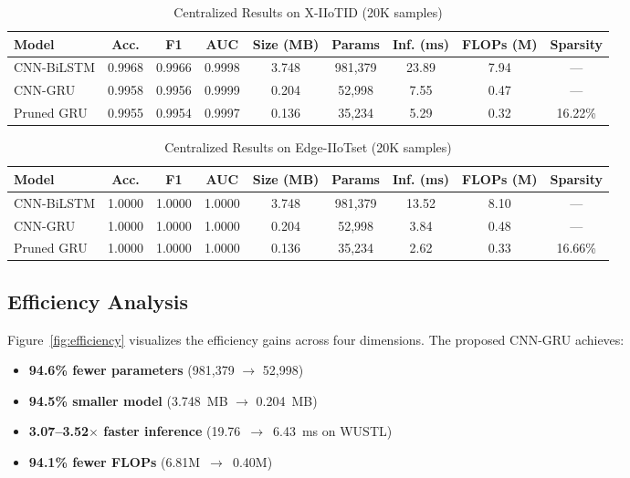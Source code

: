 \documentclass[a4paper,fleqn]{cas-sc}
\begin{document}
\begin{table}[t]
\centering
\caption{Centralized Results on X-IIoTID (20K samples)}
\label{tab:xiitoid}
\begin{tabular}{lcccccccc}
\toprule
Model & Acc. & F1 & AUC & Size (MB) & Params & Inf. (ms) & FLOPs (M) & Sparsity \\
\midrule
CNN-BiLSTM & 0.9968 & 0.9966 & 0.9998 & 3.748 & 981,379 & 23.89 & 7.94 & --- \\
CNN-GRU & 0.9958 & 0.9956 & 0.9999 & 0.204 & 52,998 & 7.55 & 0.47 & --- \\
Pruned GRU & 0.9955 & 0.9954 & 0.9997 & 0.136 & 35,234 & 5.29 & 0.32 & 16.22\% \\
\bottomrule
\end{tabular}
\end{table}

\begin{table}[t]
\centering
\caption{Centralized Results on Edge-IIoTset (20K samples)}
\label{tab:edge}
\begin{tabular}{lcccccccc}
\toprule
Model & Acc. & F1 & AUC & Size (MB) & Params & Inf. (ms) & FLOPs (M) & Sparsity \\
\midrule
CNN-BiLSTM & 1.0000 & 1.0000 & 1.0000 & 3.748 & 981,379 & 13.52 & 8.10 & --- \\
CNN-GRU & 1.0000 & 1.0000 & 1.0000 & 0.204 & 52,998 & 3.84 & 0.48 & --- \\
Pruned GRU & 1.0000 & 1.0000 & 1.0000 & 0.136 & 35,234 & 2.62 & 0.33 & 16.66\% \\
\bottomrule
\end{tabular}
\end{table}

\subsection{Efficiency Analysis}
\label{sec:efficiency}

Figure~\ref{fig:efficiency} visualizes the efficiency gains across four dimensions. The proposed CNN-GRU achieves:
\begin{itemize}
    \item \textbf{94.6\% fewer parameters} (981,379 $\rightarrow$ 52,998)
    \item \textbf{94.5\% smaller model} (3.748~MB $\rightarrow$ 0.204~MB)
    \item \textbf{3.07--3.52$\times$ faster inference} (19.76~$\rightarrow$~6.43~ms on WUSTL)
    \item \textbf{94.1\% fewer FLOPs} (6.81M~$\rightarrow$~0.40M)
\end{itemize}
\end{document}
